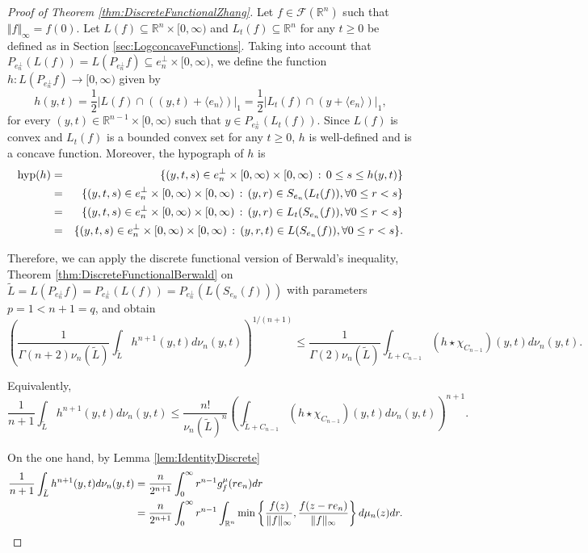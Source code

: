 \documentclass{amsart}
\newcommand{\R}{\mathbb R}
\theoremstyle{remark}
\theoremstyle{definition}
\numberwithin{equation}{section}
\begin{document}
\begin{proof}[Proof of Theorem \ref{thm:DiscreteFunctionalZhang}]
Let $f\in\mathcal{F}(\R^n)$ such that $\Vert f\Vert_\infty=f(0)$. Let $L(f)\subseteq\R^n\times[0,\infty)$ and $L_t(f)\subseteq\R^n$ for any $t\geq0$ be defined as in Section \ref{sec:LogconcaveFunctions}. Taking into account that $P_{e_n^\perp}(L(f))=L(P_{e_n^\perp}f)\subseteq e_n^\perp\times[0,\infty)$, we define the function $h:L(P_{e_n^\perp}f)\to[0,\infty)$ given by
$$
h(y,t)=\frac{1}{2}|L(f) \cap ((y,t)+\langle e_n \rangle )|_1=\frac{1}{2}|L_t(f) \cap (y+\langle e_n \rangle)|_1,
$$
for every $(y,t)\in\R^{n-1}\times[0,\infty)$ such that $y\in P_{e_n^\perp}(L_t(f))$. Since $L(f)$ is convex and $L_t(f)$ is a bounded convex set for any $t\geq0$, $h$ is well-defined and is a concave function. Moreover, the hypograph of $h$ is
\begin{eqnarray}\label{eq:HypographHOnProjection}
\textrm{hyp}(h)&=&\{(y,t,s)\in e_{n}^\perp\times[0,\infty)\times[0,\infty)\,:\, 0\leq s\leq h(y,t)\}\cr
&=&\{(y,t,s)\in e_{n}^\perp\times[0,\infty)\times[0,\infty)\,:\, (y,r)\in S_{e_n}(L_t(f)),\forall 0\leq r<s\}\cr
&=&\{(y,t,s)\in e_{n}^\perp\times[0,\infty)\times[0,\infty)\,:\,(y,r)\in L_t(S_{e_n}(f)),\forall 0\leq r<s\}\cr
&=&\{(y,t,s)\in e_{n}^\perp\times[0,\infty)\times[0,\infty)\,:\,(y,r,t)\in L(S_{e_n}(f)),\forall 0\leq r<s\}.
\end{eqnarray}

Therefore, we can apply the discrete functional version of Berwald's inequality, Theorem \ref{thm:DiscreteFunctionalBerwald} on $\tilde{L}=L(P_{e_n^\perp}f)=P_{e_n^\perp}(L(f))=P_{e_n^\perp}(L(S_{e_n}(f)))$ with parameters $p=1<n+1=q$, and obtain
$$
	\left(\frac{1}{\Gamma(n+2)\nu_n(\tilde{L})}\int_{\tilde{L}} h^{n+1}(y,t)d\nu_n(y,t)\right)^{1/(n+1)}\leq\frac{1}{\Gamma(2)\nu_n(\tilde{L})}\int_{\tilde{L}+C_{n-1}} (h\star\chi_{C_{n-1}})(y,t)d\nu_n(y,t).
$$


Equivalently,
$$
\frac{1}{n+1}\int_{\tilde{L}} h^{n+1}(y,t)d\nu_n(y,t)\leq \frac{n!}{\nu_n(\tilde{L})^n}\left(\int_{\tilde{L}+C_{n-1}} (h\star\chi_{C_{n-1}})(y,t)d\nu_n(y,t)\right)^{n+1}.
$$

On the one hand, by Lemma \ref{lem:IdentityDiscrete}
\begin{align*}
\frac{1}{n+1}\int_{\tilde{L}} h^{n+1}(y,t)d\nu_n(y,t)&=\frac{n}{2^{n+1}}\int_0^\infty r^{n-1}g_f^\mu(re_n)dr\cr
&=\frac{n}{2^{n+1}}\int_0^\infty r^{n-1}\int_{\R^n}\min\left\{\frac{f(z)}{\Vert f\Vert_\infty},\frac{f(z-re_n)}{\Vert f\Vert_\infty}\right\}d\mu_n(z)dr.
\end{align*}


\end{proof}
\end{document}
